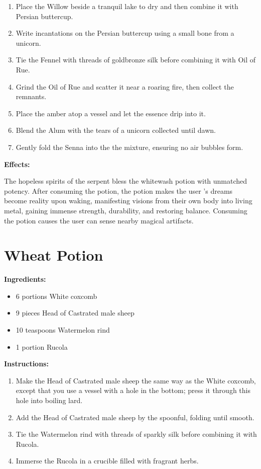 \documentclass{article}
\begin{document}
\begin{enumerate}
  \item Place the Willow beside a tranquil lake to dry and then combine it with Persian buttercup.
  \item Write incantations on the Persian buttercup using a small bone from a unicorn.
  \item Tie the Fennel with threads of goldbronze silk before combining it with Oil of Rue.
  \item Grind the Oil of Rue and scatter it near a roaring fire, then collect the remnants.
  \item Place the amber atop a vessel and let the essence drip into it.
  \item Blend the Alum with the tears of a unicorn collected until dawn.
  \item Gently fold the Senna into the the mixture, ensuring no air bubbles form.
\end{enumerate}

\textbf{Effects:}

The hopeless spirits of the serpent bless the whitewash potion with unmatched potency. After consuming the potion, the potion makes the user 's dreams become reality upon waking, manifesting visions from their own body into living metal, gaining immense strength, durability, and restoring balance. Consuming the potion causes the user can sense nearby magical artifacts.

\newpage
\section*{Wheat Potion}

\textbf{Ingredients:}

\begin{itemize}
  \item 6 portions White coxcomb
  \item 9 pieces Head of Castrated male sheep
  \item 10 teaspoons Watermelon rind
  \item 1 portion Rucola
\end{itemize}

\textbf{Instructions:}

\begin{enumerate}
  \item Make the Head of Castrated male sheep the same way as the White coxcomb, except that you use a vessel with a hole in the bottom; press it through this hole into boiling lard.
  \item Add the Head of Castrated male sheep by the spoonful, folding until smooth.
  \item Tie the Watermelon rind with threads of sparkly silk before combining it with Rucola.
  \item Immerse the Rucola in a crucible filled with fragrant herbs.
\end{enumerate}
\end{document}
